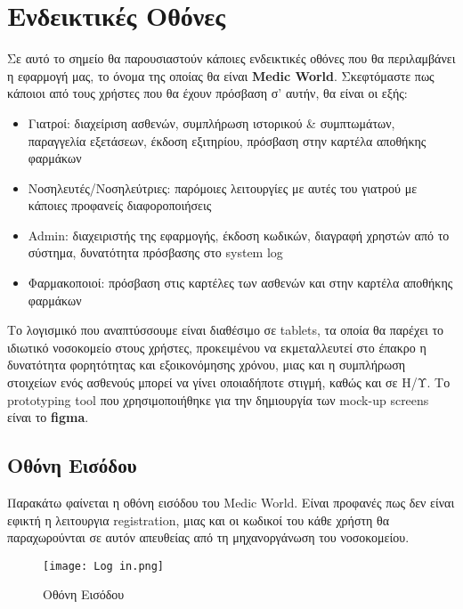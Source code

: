 \documentclass{article}
\begin{document}
\section{Ενδεικτικές Οθόνες}

Σε αυτό το σημείο θα παρουσιαστούν κάποιες ενδεικτικές οθόνες που θα περιλαμβάνει η εφαρμογή μας, το όνομα της οποίας θα είναι \textbf{Medic World}. Σκεφτόμαστε πως κάποιοι από τους χρήστες που θα έχουν πρόσβαση σ' αυτήν, θα είναι οι εξής:

\begin{itemize}
  \item Γιατροί: διαχείριση ασθενών, συμπλήρωση ιστορικού \& συμπτωμάτων, παραγγελία εξετάσεων, έκδοση εξιτηρίου, πρόσβαση στην καρτέλα αποθήκης φαρμάκων
  \item Νοσηλευτές/Νοσηλεύτριες: παρόμοιες λειτουργίες με αυτές του γιατρού με κάποιες προφανείς διαφοροποιήσεις
  \item Admin: διαχειριστής της εφαρμογής, έκδοση κωδικών, διαγραφή χρηστών από το σύστημα, δυνατότητα πρόσβασης στο system log
  \item Φαρμακοποιοί: πρόσβαση στις καρτέλες των ασθενών και στην καρτέλα αποθήκης φαρμάκων
\end{itemize}

Το λογισμικό που αναπτύσσουμε είναι διαθέσιμο σε tablets, τα οποία θα παρέχει το ιδιωτικό νοσοκομείο στους χρήστες, προκειμένου να εκμεταλλευτεί στο έπακρο η δυνατότητα φορητότητας και εξοικονόμησης χρόνου, μιας και η συμπλήρωση στοιχείων ενός ασθενούς μπορεί να γίνει οποιαδήποτε στιγμή, καθώς και σε Η/Υ. Το prototyping tool που χρησιμοποιήθηκε για την δημιουργία των mock-up screens είναι το \textbf{figma}.

\subsection{Οθόνη Εισόδου}

Παρακάτω φαίνεται η οθόνη εισόδου του Medic World. Είναι προφανές πως δεν είναι εφικτή η λειτουργια registration, μιας και οι κωδικοί του κάθε χρήστη θα παραχωρούνται σε αυτόν απευθείας από τη μηχανοργάνωση του νοσοκομείου.

\vspace{0.3cm}

\begin{figure}[!htb]
\centering
\texttt{[image: Log in.png]}
\caption{\label{fig:log in page} Οθόνη Εισόδου}
\end{figure}
\end{document}
